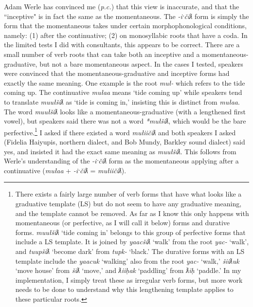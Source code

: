 Adam Werle has convinced me (\textit{p.c.}) that this view is inaccurate, and that the ``inceptive" is in fact the same as the momentaneous. The \textit{-iˑčiƛ} form is simply the form that the momentaneous takes under certain morphophonological conditions, namely: (1) after the continuative; (2) on monosyllabic roots that have a coda. In the limited tests I did with consultants, this appears to be correct. There are a small number of verb roots that can take both an inceptive and a momentaneous-graduative, but not a bare momentaneous aspect. In the cases I tested, speakers were convinced that the momentaneous-graduative and inceptive forms had exactly the same meaning. One example is the root \textit{muł-} which refers to the tide coming up. The continuative \textit{mułaa} means `tide coming up' while speakers tend to translate \textit{muułšiƛ} as `tide is coming in,' insisting this is distinct from \textit{mułaa}. The word \textit{muułšiƛ} looks like a momentaneous-graduative (with a lengthened first vowel), but speakers said there was not a word \textit{*mułšiƛ}, which would be the bare perfective.\footnote{There exists a fairly large number of verb forms that have what looks like a graduative template (LS) but do not seem to have any graduative meaning, and the template cannot be removed. As far as I know this only happens with momentaneous (or perfective, as I will call it below) forms and durative forms. \textit{muułšiƛ} `tide coming in' belongs to this group of perfective forms that include a LS template. It is joined by \textit{yaacšiƛ} `walk' from the root \textit{yac-} `walk', and \textit{tuupšiƛ} `become dark' from \textit{tupk-} `black.' The durative forms with an LS template include the \textit{yaacuk} `walking' also from the root \textit{yac-} `walk,' \textit{šiiƛuk} `move house' from \textit{šiƛ} `move,' and \textit{ƛiiḥak} `paddling' from \textit{ƛiḥ} `paddle.' In my implementation, I simply treat these as irregular verb forms, but more work needs to be done to understand why this lengthening template applies to these particular roots.} I asked if there existed a word \textit{mułiičiƛ} and both speakers I asked (Fidelia Haiyupis, northern dialect, and Bob Mundy, Barkley sound dialect) said yes, and insisted it had the exact same meaning as \textit{muułšiƛ}. This follows from Werle's understanding of the \textit{-iˑčiƛ} form as the momentaneous applying after a continuative (\textit{mułaa} + \textit{-iˑčiƛ} = \textit{mułiičiƛ}).

